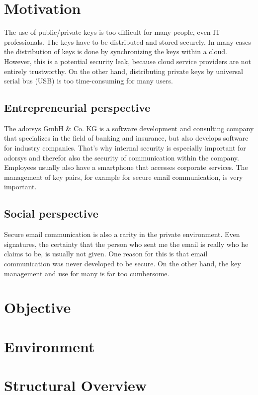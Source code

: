 \documentclass[12pt,twoside,a4paper,parskip]{scrbook}
\begin{document}
\section{Motivation}

The use of public/private keys is too difficult for many people, even IT professionals. The keys have to be distributed and stored securely. In many cases the distribution of keys is done by synchronizing the keys within a cloud. However, this is a potential security leak, because cloud service providers are not entirely trustworthy. On the other hand, distributing private keys
by universal serial bus (USB) is too time-consuming for many users.

\subsection{Entrepreneurial perspective}

The adorsys GmbH \& Co. KG is a software development and consulting company that specializes in the field of banking and insurance, but also develops software for industry companies. That's why internal security is especially important for adorsys and therefor also the security of communication within the company. Employees usually also have a smartphone that accesses corporate services. The management of key pairs, for example for secure email communication, is very important. 

\subsection{Social perspective}

Secure email communication is also a rarity in the private environment. Even signatures, the certainty that the person who sent me the email is really who he claims to be, is usually not given. 
One reason for this is that email communication was never developed to be secure. On the other hand, the key management and use for many is far too cumbersome. 

\section{Objective}

\section{Environment}

\section{Structural Overview}
\end{document}
